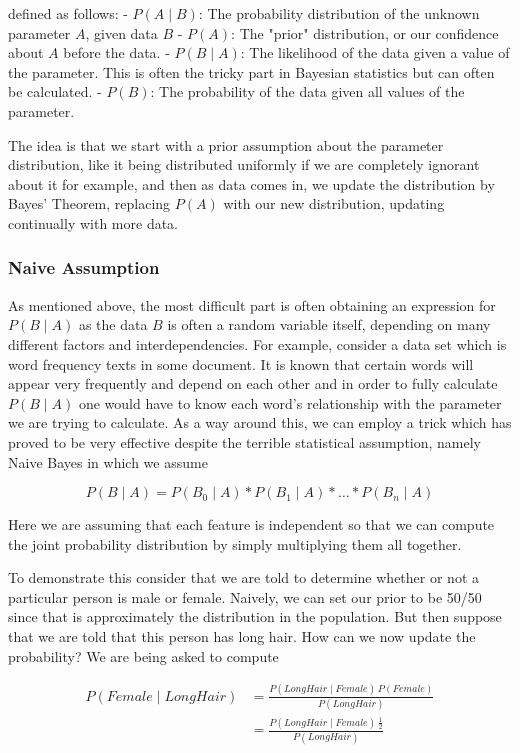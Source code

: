 \documentclass[11pt]{article}
\begin{document}
defined as follows: - \(P(A\mid B)\): The probability distribution of
the unknown parameter \(A\), given data \(B\) - \(P(A)\): The "prior"
distribution, or our confidence about \(A\) before the data. -
\(P(B \mid A)\): The likelihood of the data given a value of the
parameter. This is often the tricky part in Bayesian statistics but can
often be calculated. - \(P(B)\): The probability of the data given all
values of the parameter.

The idea is that we start with a prior assumption about the parameter
distribution, like it being distributed uniformly if we are completely
ignorant about it for example, and then as data comes in, we update the
distribution by Bayes' Theorem, replacing \(P(A)\) with our new
distribution, updating continually with more data.

\subsubsection{Naive Assumption}\label{naive-assumption}

As mentioned above, the most difficult part is often obtaining an
expression for \(P(B \mid A)\) as the data \(B\) is often a random
variable itself, depending on many different factors and
interdependencies. For example, consider a data set which is word
frequency texts in some document. It is known that certain words will
appear very frequently and depend on each other and in order to fully
calculate \(P(B \mid A)\) one would have to know each word's
relationship with the parameter we are trying to calculate. As a way
around this, we can employ a trick which has proved to be very effective
despite the terrible statistical assumption, namely Naive Bayes in which
we assume

\[P(B \mid A) = P(B_0 \mid A)*P(B_1 \mid A)*\dots*P(B_n \mid A)\]

Here we are assuming that each feature is independent so that we can
compute the joint probability distribution by simply multiplying them
all together.

To demonstrate this consider that we are told to determine whether or
not a particular person is male or female. Naively, we can set our prior
to be 50/50 since that is approximately the distribution in the
population. But then suppose that we are told that this person has long
hair. How can we now update the probability? We are being asked to
compute

\[\begin{align}
P(Female\mid Long Hair) &= \frac{P(Long Hair \mid Female) \, P(Female)}{P(Long Hair)} \\
&= \frac{P(Long Hair \mid Female) \, \frac{1}{2}}{P(Long Hair)}
\end{align}\]
\end{document}
